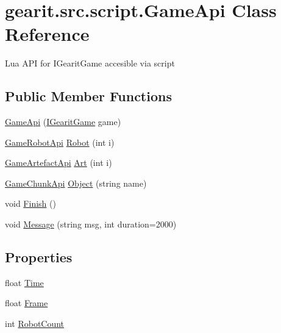 \hypertarget{classgearit_1_1src_1_1script_1_1_game_api}{\section{gearit.\+src.\+script.\+Game\+Api Class Reference}
\label{classgearit_1_1src_1_1script_1_1_game_api}
}


Lua A\+P\+I for I\+Gearit\+Game accesible via script  


\subsection*{Public Member Functions}
\begin{DoxyCompactItemize}
\item 
\hyperlink{classgearit_1_1src_1_1script_1_1_game_api_a703d982e6264255355aa6253338d5d1b}{Game\+Api} (\hyperlink{interfacegearit_1_1src_1_1game_1_1_i_gearit_game}{I\+Gearit\+Game} game)
\item 
\hyperlink{classgearit_1_1src_1_1script_1_1api_1_1game_1_1_game_robot_api}{Game\+Robot\+Api} \hyperlink{classgearit_1_1src_1_1script_1_1_game_api_a82b2e1c253998b657b15e65399f78828}{Robot} (int i)
\item 
\hyperlink{classgearit_1_1src_1_1script_1_1api_1_1game_1_1_game_artefact_api}{Game\+Artefact\+Api} \hyperlink{classgearit_1_1src_1_1script_1_1_game_api_a9350ddba654db554519b4f6fb45d6255}{Art} (int i)
\item 
\hyperlink{classgearit_1_1src_1_1script_1_1api_1_1game_1_1_game_chunk_api}{Game\+Chunk\+Api} \hyperlink{classgearit_1_1src_1_1script_1_1_game_api_ac85c011aa7df74768434f9a707b46d65}{Object} (string name)
\item 
void \hyperlink{classgearit_1_1src_1_1script_1_1_game_api_ac0d3d716bf903d0f0c3e3ba4c05a1bb3}{Finish} ()
\item 
void \hyperlink{classgearit_1_1src_1_1script_1_1_game_api_acd16b1ccf76c849cffc2b2c38e9af52e}{Message} (string msg, int duration=2000)
\end{DoxyCompactItemize}
\subsection*{Properties}
\begin{DoxyCompactItemize}
\item 
float \hyperlink{classgearit_1_1src_1_1script_1_1_game_api_a285fb90fb252459338255542d80bd144}{Time}
\item 
float \hyperlink{classgearit_1_1src_1_1script_1_1_game_api_af5db6ace21fae68628f334a5e6351198}{Frame}
\item 
int \hyperlink{classgearit_1_1src_1_1script_1_1_game_api_a91c29ec861456250febb94f04e86f4c4}{Robot\+Count}
\end{DoxyCompactItemize}


